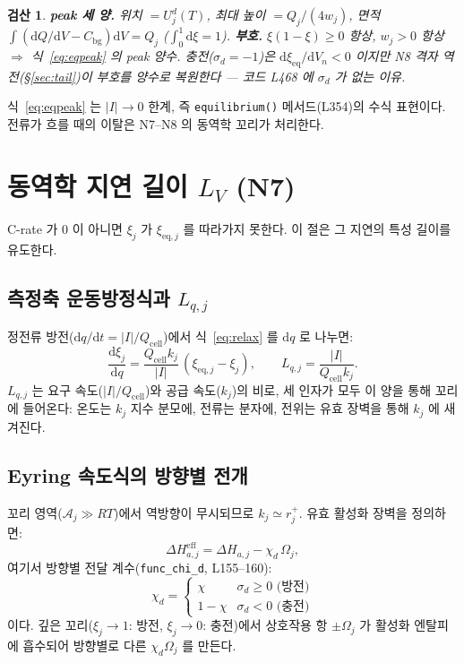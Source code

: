 \documentclass[11pt,a4paper]{article}
\newtheorem*{verifybox}{검산}
\newcommand{\dd}{\mathrm{d}}
\newcommand{\eff}{\mathrm{eff}}
\newcommand{\eq}{\mathrm{eq}}
\newcommand{\cell}{\mathrm{cell}}
\newcommand{\bg}{\mathrm{bg}}
\begin{document}
\begin{verifybox}
\textbf{peak 세 양.} 위치 $=U_j^d(T)$, 최대 높이 $=Q_j/(4w_j)$, 면적
$\int(\dd Q/\dd V - C_\bg)\dd V = Q_j$ ($\int_0^1\dd\xi=1$).
\textbf{부호.} $\xi(1-\xi)\ge0$ 항상, $w_j>0$ 항상 $\Rightarrow$ 식~\eqref{eq:eqpeak}
의 peak 양수. 충전($\sigma_d=-1$)은 $\dd\xi_{\eq}/\dd V_n<0$ 이지만
N8 격자 역전(\S\ref{sec:tail})이 부호를 양수로 복원한다 — 코드 L468 에
$\sigma_d$ 가 없는 이유.
\end{verifybox}

식~\eqref{eq:eqpeak} 는 $|I|\to0$ 한계, 즉 \texttt{equilibrium()} 메서드(L354)의
수식 표현이다. 전류가 흐를 때의 이탈은 N7--N8 의 동역학 꼬리가 처리한다.

\section{동역학 지연 길이 $L_V$ (N7)}\label{sec:lag}

C-rate 가 0 이 아니면 $\xi_j$ 가 $\xi_{\eq,j}$ 를 따라가지 못한다. 이 절은
그 지연의 특성 길이를 유도한다.

\subsection{측정축 운동방정식과 $L_{q,j}$}

정전류 방전($\dd q/\dd t = |I|/Q_\cell$)에서 식~\eqref{eq:relax} 를 $\dd q$ 로 나누면:
\begin{equation}
\frac{\dd\xi_j}{\dd q}
= \frac{Q_\cell k_j}{|I|}\,(\xi_{\eq,j}-\xi_j),
\qquad
L_{q,j} = \frac{|I|}{Q_\cell k_j}.
\label{eq:Lq}
\end{equation}
$L_{q,j}$ 는 요구 속도($|I|/Q_\cell$)와 공급 속도($k_j$)의 비로, 세 인자가 모두 이 양을
통해 꼬리에 들어온다: 온도는 $k_j$ 지수 분모에, 전류는 분자에, 전위는 유효 장벽을
통해 $k_j$ 에 새겨진다.

\subsection{Eyring 속도식의 방향별 전개}

꼬리 영역($\mathcal{A}_j\gg RT$)에서 역방향이 무시되므로 $k_j\simeq r_j^+$. 유효
활성화 장벽을 정의하면:
\begin{equation}
\Delta H_{a,j}^\eff = \Delta H_{a,j} - \chi_d\,\Omega_j,
\label{eq:dHeff}
\end{equation}
여기서 방향별 전달 계수(\texttt{func\_chi\_d}, L155--160):
\begin{equation}
\chi_d =
\begin{cases} \chi & \sigma_d \ge 0 \text{ (방전)}\\
1-\chi & \sigma_d < 0 \text{ (충전)}
\end{cases}
\label{eq:chid}
\end{equation}
이다. 깊은 꼬리($\xi_j\to1$: 방전, $\xi_j\to0$: 충전)에서 상호작용 항 $\pm\Omega_j$ 가
활성화 엔탈피에 흡수되어 방향별로 다른 $\chi_d\Omega_j$ 를 만든다.
\end{document}
